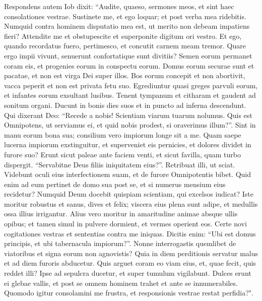 \begin{biblechapter}  
\verse Respondens autem Iob dixit: 
\verse “Audite, quaeso, sermones meos, et sint haec consolationes vestrae. 
\verse Sustinete me, et ego loquar; et post verba mea ridebitis. 
\verse Numquid contra hominem disputatio mea est, ut merito non debeam impatiens fieri? 
\verse Attendite me et obstupescite et superponite digitum ori vestro. 
\verse Et ego, quando recordatus fuero, pertimesco, et concutit carnem meam tremor. 
\verse Quare ergo impii vivunt, senuerunt confortatique sunt divitiis? 
\verse Semen eorum permanet coram eis, et progenies eorum in conspectu eorum. 
\verse Domus eorum securae sunt et pacatae, et non est virga Dei super illos. 
\verse Bos eorum concepit et non abortivit, vacca peperit et non est privata fetu suo. 
\verse Egrediuntur quasi greges parvuli eorum, et infantes eorum exsultant lusibus. 
\verse Tenent tympanum et citharam et gaudent ad sonitum organi. 
\verse Ducunt in bonis dies suos et in puncto ad inferna descendunt. 
\verse Qui dixerant Deo: “Recede a nobis! Scientiam viarum tuarum nolumus. 
\verse Quis est Omnipotens, ut serviamus ei, et quid nobis prodest, si oraverimus illum?”. 
\verse Sint in manu eorum bona sua; consilium vero impiorum longe sit a me. 
\verse Quam saepe lucerna impiorum exstinguitur, et superveniet eis pernicies, et dolores dividet in furore suo? 
\verse Erunt sicut paleae ante faciem venti, et sicut favilla, quam turbo dispergit. 
\verse “Servabitne Deus filiis iniquitatem eius?”. Retribuat illi, ut sciat. 
\verse Videbunt oculi eius interfectionem suam, et de furore Omnipotentis bibet. 
\verse Quid enim ad eum pertinet de domo sua post se, et si numerus mensium eius recidetur? 
\verse Numquid Deum docebit quispiam scientiam, qui excelsos iudicat? 
\verse Iste moritur robustus et sanus, dives et felix; 
\verse viscera eius plena sunt adipe, et medullis ossa illius irrigantur. 
\verse Alius vero moritur in amaritudine animae absque ullis opibus; 
\verse et tamen simul in pulvere dormient, et vermes operient eos. 
\verse Certe novi cogitationes vestras et sententias contra me iniquas. 
\verse Dicitis enim: “Ubi est domus principis, et ubi tabernacula impiorum?”. 
\verse Nonne interrogastis quemlibet de viatoribus et signa eorum non agnovistis? 
\verse Quia in diem perditionis servatur malus et ad diem furoris abducetur. 
\verse Quis arguet coram eo viam eius, et, quae fecit, quis reddet illi? 
\verse Ipse ad sepulcra ducetur, et super tumulum vigilabunt. 
\verse Dulces erunt ei glebae vallis, et post se omnem hominem trahet et ante se innumerabiles. 
\verse Quomodo igitur consolamini me frustra, et responsionis vestrae restat perfidia?". 
\end{biblechapter}

